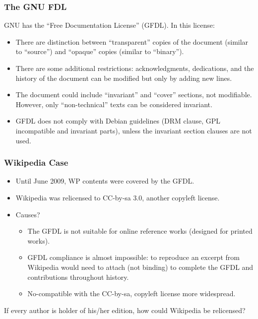 


\begin{frame}
\frametitle{The GNU FDL}

GNU has the ``Free Documentation License'' (GFDL). In this license:
\begin{itemize}
\item There are distinction between ``transparent'' copies of the
  document (similar to ``source'') and ``opaque'' copies (similar to
  ``binary'').
\item There are some additional restrictions: acknowledgments,
  dedications, and the history of the document can be modified but
  only by adding new lines.
\item The document could include ``invariant'' and ``cover'' sections, not
  modifiable. However, only ``non-technical'' texts can be considered
  invariant.
\item GFDL does not comply with Debian guidelines (DRM clause, GPL incompatible and 
invariant parts), unless the invariant section clauses are not used. 

\end{itemize}


\end{frame}


\begin{frame}
\frametitle{Wikipedia Case}

\begin{itemize}
\item Until June 2009, WP contents were covered by the GFDL.
\item Wikipedia was relicensed to CC-by-sa 3.0, another copyleft license.
\item Causes? 

\pause

\small
	\begin{itemize}
		\item The GFDL is not suitable for online reference works (designed for printed works). 
		\item GFDL compliance is almost impossible: to reproduce an excerpt from Wikipedia would need to attach (not binding) to complete the GFDL and contributions throughout history.
		\item No-compatible with the CC-by-sa, copyleft license more widespread.
	\end{itemize}

\end{itemize}

\pause
\begin{center}
\alert{If every author is holder of his/her edition, how could Wikipedia be relicensed?}
\end{center}

\end{frame}



